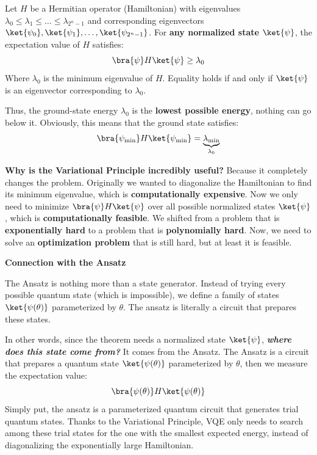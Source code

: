 \highspace
\begin{theorem}
    Let $H$ be a Hermitian operator (Hamiltonian) with eigenvalues $\lambda_0 \leq \lambda_1 \leq \dots \leq \lambda_{2^n-1}$ and corresponding eigenvectors $\ket{\psi_0}, \ket{\psi_1}, \dots, \ket{\psi_{2^n-1}}$. For \textbf{any normalized state} $\ket{\psi}$, the expectation value of $H$ satisfies:
    \begin{equation}\label{eq:variational-principle}
        \bra{\psi} H \ket{\psi} \geq \lambda_0
    \end{equation}
    Where $\lambda_0$ is the minimum eigenvalue of $H$. Equality holds if and only if $\ket{\psi}$ is an eigenvector corresponding to $\lambda_0$.
\end{theorem}

\noindent
Thus, the ground-state energy $\lambda_0$ is the \textbf{lowest possible energy}, nothing can go below it. Obviously, this means that the ground state satisfies:
\begin{equation*}
    \bra{\psi_{\min}} H \ket{\psi_{\min}} = \underbrace{\lambda_{\min}}_{\lambda_0}
\end{equation*}

\highspace
\textcolor{Green3}{ \textbf{Why is the Variational Principle incredibly useful?}} Because it completely changes the problem. Originally we wanted to diagonalize the Hamiltonian to find its minimum eigenvalue, which is \textbf{computationally expensive}. Now we only need to minimize $\bra{\psi} H \ket{\psi}$ over all possible normalized states $\ket{\psi}$, which is \textbf{computationally feasible}. We shifted from a problem that is \textbf{exponentially hard} to a problem that is \textbf{polynomially hard}. Now, we need to solve an \textbf{optimization problem} that is still hard, but at least it is feasible.

\highspace
\begin{flushleft}
    \textcolor{Green3}{ \textbf{Connection with the Ansatz}}
\end{flushleft}
The Ansatz is nothing more than a state generator. Instead of trying every possible quantum state (which is impossible), we define a family of states $\ket{\psi(\theta)}$ parameterized by $\theta$. The ansatz is literally a circuit that prepares these states.

\highspace
In other words, since the theorem needs a normalized state $\ket{\psi}$, \textbf{\emph{where does this state come from?}} It comes from the Ansatz. The Ansatz is a circuit that prepares a quantum state $\ket{\psi(\theta)}$ parameterized by $\theta$, then we measure the expectation value:
\begin{equation*}
    \bra{\psi(\theta)} H \ket{\psi(\theta)}
\end{equation*}
Simply put, the ansatz is a parameterized quantum circuit that generates trial quantum states. Thanks to the Variational Principle, VQE only needs to search among these trial states for the one with the smallest expected energy, instead of diagonalizing the exponentially large Hamiltonian.

